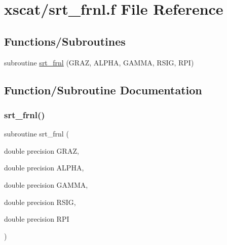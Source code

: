 \hypertarget{xscat_2srt__frnl_8f}{}\section{xscat/srt\+\_\+frnl.f File Reference}
\label{xscat_2srt__frnl_8f}
\subsection*{Functions/\+Subroutines}
\begin{DoxyCompactItemize}
\item 
subroutine \hyperlink{xscat_2srt__frnl_8f_acf68a0af600d5c36ae278932e61da241}{srt\+\_\+frnl} (G\+R\+AZ, A\+L\+P\+HA, G\+A\+M\+MA, R\+S\+IG, R\+PI)
\end{DoxyCompactItemize}


\subsection{Function/\+Subroutine Documentation}
\mbox{\label{xscat_2srt__frnl_8f_acf68a0af600d5c36ae278932e61da241}} 
\subsubsection{\texorpdfstring{srt\+\_\+frnl()}{srt\_frnl()}}
{\footnotesize\ttfamily subroutine srt\+\_\+frnl (\begin{DoxyParamCaption}\item[{double precision}]{G\+R\+AZ,  }\item[{double precision}]{A\+L\+P\+HA,  }\item[{double precision}]{G\+A\+M\+MA,  }\item[{double precision}]{R\+S\+IG,  }\item[{double precision}]{R\+PI }\end{DoxyParamCaption})}

